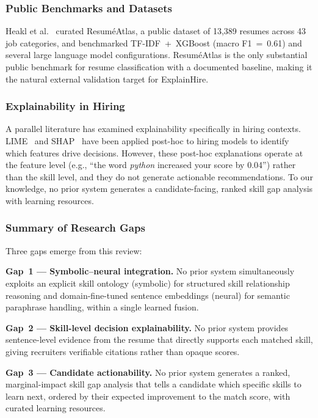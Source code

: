 \documentclass[conference]{IEEEtran}
\begin{document}
\subsubsection{Public Benchmarks and Datasets}
Heakl et al.~\cite{heakl2024resumeatlas} curated Resum\'eAtlas, a
public dataset of 13,389 resumes across 43 job categories, and benchmarked
TF-IDF~+~XGBoost (macro F1~=~0.61) and several large language model
configurations. Resum\'eAtlas is the only substantial public benchmark
for resume classification with a documented baseline, making it the natural
external validation target for ExplainHire.

\subsubsection{Explainability in Hiring}
A parallel literature has examined explainability specifically in hiring
contexts. LIME~\cite{ribeiro2016lime} and SHAP~\cite{lundberg2017shap}
have been applied post-hoc to hiring models to identify which features
drive decisions. However, these post-hoc explanations operate at the
feature level (e.g., ``the word \textit{python} increased your score by
0.04'') rather than the skill level, and they do not generate actionable
recommendations. To our knowledge, no prior system generates a
candidate-facing, ranked skill gap analysis with learning resources.

\subsubsection{Summary of Research Gaps}
Three gaps emerge from this review:

\textbf{Gap~1 --- Symbolic--neural integration.}
No prior system simultaneously exploits an explicit skill ontology
(symbolic) for structured skill relationship reasoning and domain-fine-tuned
sentence embeddings (neural) for semantic paraphrase handling, within a
single learned fusion.

\textbf{Gap~2 --- Skill-level decision explainability.}
No prior system provides sentence-level evidence from the resume that
directly supports each matched skill, giving recruiters verifiable citations
rather than opaque scores.

\textbf{Gap~3 --- Candidate actionability.}
No prior system generates a ranked, marginal-impact skill gap analysis that
tells a candidate which specific skills to learn next, ordered by their
expected improvement to the match score, with curated learning resources.
\end{document}
